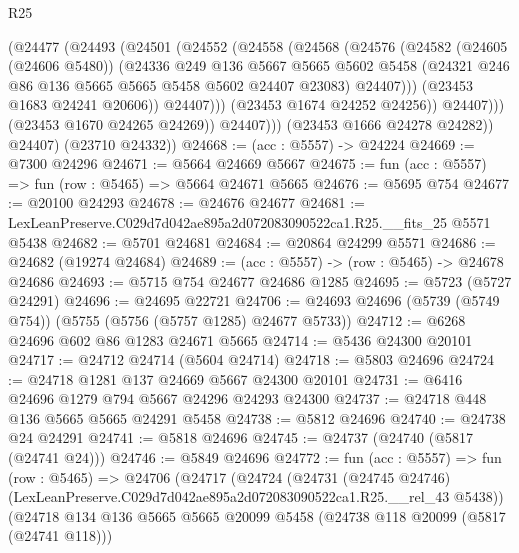 \begin{lexlean}{R25}
\begin{coremodule}
                      (@24477
                        (@24493
                          (@24501
                            (@24552
                              (@24558
                                (@24568
                                  (@24576
                                    (@24582
                                      (@24605 (@24606 @5480))
                                      (@24336
                                        @249
                                        @136
                                        @5667
                                        @5665
                                        @5602
                                        @5458
                                        (@24321 @246 @86 @136 @5665 @5665 @5458 @5602 @24407 @23083)
                                        @24407)))
                                  (@23453 @1683 @24241 @20606))
                                @24407)))
                          (@23453 @1674 @24252 @24256))
                        @24407)))
                  (@23453 @1670 @24265 @24269))
                @24407)))
          (@23453 @1666 @24278 @24282))
        @24407)
      (@23710 @24332))
@24668 := (acc : @5557) -> @24224
@24669 := @7300 @24296
@24671 := @5664 @24669 @5667
@24675 := fun (acc : @5557) => fun (row : @5465) => @5664 @24671 @5665
@24676 := @5695 @754
@24677 := @20100 @24293
@24678 := @24676 @24677
@24681 := LexLeanPreserve.C029d7d042ae895a2d072083090522ca1.R25.__fits_25 @5571 @5438
@24682 := @5701 @24681
@24684 := @20864 @24299 @5571
@24686 := @24682 (@19274 @24684)
@24689 := (acc : @5557) -> (row : @5465) -> @24678 @24686
@24693 := @5715 @754 @24677 @24686 @1285
@24695 := @5723 (@5727 @24291)
@24696 := @24695 @22721
@24706 := @24693 @24696 (@5739 (@5749 @754)) (@5755 (@5756 (@5757 @1285) @24677 @5733))
@24712 := @6268 @24696 @602 @86 @1283 @24671 @5665
@24714 := @5436 @24300 @20101
@24717 := @24712 @24714 (@5604 @24714)
@24718 := @5803 @24696
@24724 := @24718 @1281 @137 @24669 @5667 @24300 @20101
@24731 := @6416 @24696 @1279 @794 @5667 @24296 @24293 @24300
@24737 := @24718 @448 @136 @5665 @5665 @24291 @5458
@24738 := @5812 @24696
@24740 := @24738 @24 @24291
@24741 := @5818 @24696
@24745 := @24737 (@24740 (@5817 (@24741 @24)))
@24746 := @5849 @24696
@24772 := fun (acc : @5557) =>
  fun (row : @5465) =>
  @24706
    (@24717
      (@24724
        (@24731
          (@24745 @24746)
          (LexLeanPreserve.C029d7d042ae895a2d072083090522ca1.R25.__rel_43 @5438))
        (@24718
          @134
          @136
          @5665
          @5665
          @20099
          @5458
          (@24738 @118 @20099 (@5817 (@24741 @118)))

\end{coremodule}
\end{lexlean}
